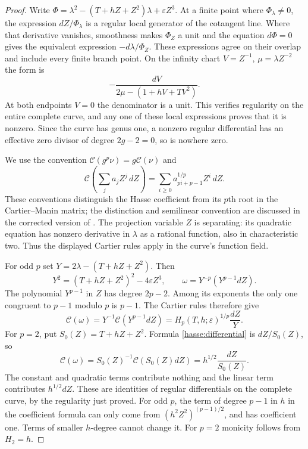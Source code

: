 \begin{proof}
Write $\Phi=\lambda^2-(T+hZ+Z^2)\lambda+\varepsilon Z^3$.
At a finite point where $\Phi_\lambda\ne0$, the expression
$dZ/\Phi_\lambda$ is a regular local generator of the cotangent
line.  Where that derivative vanishes, smoothness makes
$\Phi_Z$ a unit and the equation $d\Phi=0$ gives the equivalent
expression $-d\lambda/\Phi_Z$.  These expressions agree on their
overlap and include every finite branch point.
On the infinity chart $V=Z^{-1}$, $\mu=\lambda Z^{-2}$ the form is
\[
-\frac{dV}{2\mu-(1+hV+TV^2)}.
\]
At both endpoints $V=0$ the denominator is a unit.  This verifies
regularity on the entire complete curve, and any one of these local
expressions proves that it is nonzero.  Since the curve has genus
one, a nonzero regular differential has an effective zero divisor
of degree $2g-2=0$, so is nowhere zero.

We use the convention
$\mathcal C(g^p\nu)=g\mathcal C(\nu)$ and
\[
\mathcal C\left(\sum_j a_jZ^j\,dZ\right)
=\sum_{i\geq0}a_{pi+p-1}^{1/p}Z^i\,dZ.
\]
These conventions distinguish the Hasse coefficient from its
$p$th root in the Cartier--Manin matrix; the distinction and
semilinear convention are discussed in the corrected version of
\cite[Section 2.5]{AchterHowe2019}.
The projection variable $Z$ is separating: its quadratic equation
has nonzero derivative in $\lambda$ as a rational function, also
in characteristic two.  Thus the displayed Cartier rules apply
in the curve's function field.

For odd $p$ set $Y=2\lambda-(T+hZ+Z^2)$.  Then
\[
Y^2=(T+hZ+Z^2)^2-4\varepsilon Z^3,
\qquad\omega=Y^{-p}(Y^{p-1}dZ).
\]
The polynomial $Y^{p-1}$ in $Z$ has degree $2p-2$.
Among its exponents the only one congruent to $p-1$ modulo $p$
is $p-1$.  The Cartier rules therefore give
\[
\mathcal C(\omega)
=Y^{-1}\mathcal C(Y^{p-1}dZ)
=H_p(T,h;\varepsilon)^{1/p}\frac{dZ}{Y}.
\]
For $p=2$, put $S_0(Z)=T+hZ+Z^2$.  Formula
\eqref{hasse:differential} is $dZ/S_0(Z)$, so
\[
\mathcal C(\omega)
=S_0(Z)^{-1}\mathcal C(S_0(Z)dZ)
=h^{1/2}\frac{dZ}{S_0(Z)}.
\]
The constant and quadratic terms contribute nothing and the linear
term contributes $h^{1/2}dZ$.  These are identities of regular
differentials on the complete curve, by the regularity just proved.
For odd $p$, the term of degree $p-1$ in $h$ in the coefficient
formula can only come from
$(h^2Z^2)^{(p-1)/2}$, and has coefficient one.  Terms of smaller
$h$-degree cannot change it.  For $p=2$ monicity follows from
$H_2=h$.


\end{proof}
